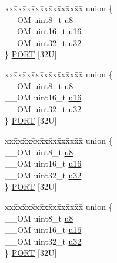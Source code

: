 \begin{DoxyCompactItemize}
\begin{tabbing}
\end{tabbing}\item 
\begin{tabbing}
xx\=xx\=xx\=xx\=xx\=xx\=xx\=xx\=xx\=\kill
union \{\\
\>\_\_OM uint8\_t \hyperlink{struct_i_t_m___type_ae773bf9f9dac64e6c28b14aa39f74275}{u8}\\
\>\_\_OM uint16\_t \hyperlink{struct_i_t_m___type_a962a970dfd286cad7f8a8577e87d4ad3}{u16}\\
\>\_\_OM uint32\_t \hyperlink{struct_i_t_m___type_a5834885903a557674f078f3b71fa8bc8}{u32}\\
\} \hyperlink{struct_i_t_m___type_a6ca4dbb3a8d0a64815b500481c226370}{PORT} \mbox{[}32U\mbox{]}\\

\end{tabbing}\item 
\begin{tabbing}
xx\=xx\=xx\=xx\=xx\=xx\=xx\=xx\=xx\=\kill
union \{\\
\>\_\_OM uint8\_t \hyperlink{struct_i_t_m___type_ae773bf9f9dac64e6c28b14aa39f74275}{u8}\\
\>\_\_OM uint16\_t \hyperlink{struct_i_t_m___type_a962a970dfd286cad7f8a8577e87d4ad3}{u16}\\
\>\_\_OM uint32\_t \hyperlink{struct_i_t_m___type_a5834885903a557674f078f3b71fa8bc8}{u32}\\
\} \hyperlink{struct_i_t_m___type_a0a29b660072699beb29486fe5e1675a3}{PORT} \mbox{[}32U\mbox{]}\\

\end{tabbing}\item 
\begin{tabbing}
xx\=xx\=xx\=xx\=xx\=xx\=xx\=xx\=xx\=\kill
union \{\\
\>\_\_OM uint8\_t \hyperlink{struct_i_t_m___type_ae773bf9f9dac64e6c28b14aa39f74275}{u8}\\
\>\_\_OM uint16\_t \hyperlink{struct_i_t_m___type_a962a970dfd286cad7f8a8577e87d4ad3}{u16}\\
\>\_\_OM uint32\_t \hyperlink{struct_i_t_m___type_a5834885903a557674f078f3b71fa8bc8}{u32}\\
\} \hyperlink{struct_i_t_m___type_a4ce174a5f5eaaa9a278eea39b42966d9}{PORT} \mbox{[}32U\mbox{]}\\

\end{tabbing}\item 
\begin{tabbing}
xx\=xx\=xx\=xx\=xx\=xx\=xx\=xx\=xx\=\kill
union \{\\
\>\_\_OM uint8\_t \hyperlink{struct_i_t_m___type_ae773bf9f9dac64e6c28b14aa39f74275}{u8}\\
\>\_\_OM uint16\_t \hyperlink{struct_i_t_m___type_a962a970dfd286cad7f8a8577e87d4ad3}{u16}\\
\>\_\_OM uint32\_t \hyperlink{struct_i_t_m___type_a5834885903a557674f078f3b71fa8bc8}{u32}\\
\} \hyperlink{struct_i_t_m___type_a3bf05bf08f89c7cd5b44a333585b19f0}{PORT} \mbox{[}32U\mbox{]}\\


\end{tabbing}
\end{DoxyCompactItemize}

